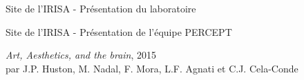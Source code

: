 
\begin{thebibliography}{99}

	  Site de l'IRISA - Présentation du laboratoire\\
      
	  Site de l'IRISA - Présentation de l'équipe PERCEPT\\

      \emph{Art, Aesthetics, and the brain}, 2015\\
      par J.P. Huston, M. Nadal, F. Mora, L.F. Agnati et C.J. Cela-Conde

\end{thebibliography}
